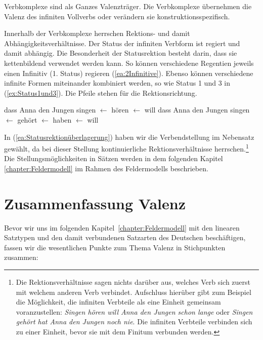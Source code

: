 Verbkomplexe sind als Ganzes Valenzträger. Die Verbkomplexe übernehmen die Valenz des infiniten Vollverbs oder verändern sie konstruktionsspezifisch. 

Innerhalb der Verbkomplexe herrschen Rektions- und damit Abhängigkeitsverhältnisse. Der Status der infiniten Verbform ist regiert und damit abhängig. Die Besonderheit der Statusrektion besteht darin, dass sie kettenbildend verwendet werden kann. So können \zB verschiedene Regentien jeweils einen Infinitiv (1. Status) regieren (\ref{ea:2Infinitive}). Ebenso können verschiedene infinite Formen miteinander kombiniert werden, so wie Status 1 und 3 in (\ref{ex:Status1und3}). Die Pfeile stehen für die Rektionsrichtung. 
 
 \ea \label{ea:Statusrektionüberlagerung}
 \ea \label{ea:2Infinitive} dass Anna den Jungen singen $\leftarrow$ hören $\leftarrow$ will
 \ex \label{ex:Status1und3} dass Anna den Jungen singen $\leftarrow$ gehört $\leftarrow$ haben $\leftarrow$ will 
 \z
 \z 
 
In (\ref{ea:Statusrektionüberlagerung}) haben wir die Verbendstellung im Nebensatz gewählt, da bei dieser Stellung kontinuierliche Rektionsverhältnisse herrschen.\footnote{Die Rektionsverhältnisse sagen nichts darüber aus, welches Verb sich zuerst mit welchem anderen Verb verbindet. Aufschluss hierüber gibt zum Beispiel die Möglichkeit, die infiniten Verbteile als eine Einheit gemeinsam voranzustellen: \textit{Singen hören will Anna den Jungen schon lange} oder \textit{Singen gehört hat Anna den Jungen noch nie}. Die infiniten Verbteile verbinden sich zu einer Einheit, bevor sie mit dem Finitum verbunden werden.} Die Stellungsmöglichkeiten in Sätzen werden in dem folgenden Kapitel \ref{chapter:Feldermodell} im Rahmen des Feldermodells beschrieben.


\section{Zusammenfassung Valenz}\label{section:Zfsg_Valenz}

Bevor wir uns im folgenden Kapitel~\ref{chapter:Feldermodell} mit den linearen Satztypen und den damit verbundenen Satzarten des Deutschen beschäftigen, fassen wir die wesentlichen Punkte zum Thema Valenz in Stichpunkten zusammen:

